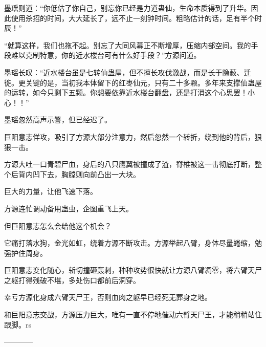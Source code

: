 \begin{this_body}
墨瑶则道：“你低估了你自己，别忘你已经是力道蛊仙，生命本质得到了升华。因此使用杀招的时间，大大延长了，远不止一刻钟时间。粗略估计的话，足有半个时辰！”

“就算这样，我们也拖不起。别忘了大同风幕正不断增厚，压缩内部空间。我的手段难以克制特意，你的近水楼台可有什么好手段？”方源问道。

墨瑶长叹：“近水楼台虽是七转仙蛊屋，但不擅长攻伐激战，而是长于隐蔽、迁徙。更关键的是，当初我本体留下的红枣仙元，只有二十多颗。多年来支撑仙蛊屋的运转，如今只剩下五颗。你想要依靠近水楼台翻盘，还是打消这个心思罢！小心！！”

墨瑶忽然高声示警，但已经迟了。

巨阳意志佯攻，吸引了方源大部分注意力，然后忽然一个转折，绕到他的背后，狠狠一击。

方源大吐一口青碧尸血，身后的八只鹰翼被撞成了渣，脊椎被这一击彻底打断，整个后背内凹下去，胸膛则向前凸出一大块。

巨大的力量，让他飞速下落。

方源连忙调动备用蛊虫，企图重飞上天。

但巨阳意志怎么会给他这个机会？

它痛打落水狗，金光如虹，绕着方源不断攻击。方源举起八臂，身体尽量蜷缩，勉强护住周身。

巨阳意志变化随心，斩切撞砸轰刺，种种攻势很快就让方源八臂凋零，将六臂天尸之躯打得残破不堪，多处伤口都前后洞穿。

幸亏方源化身成六臂天尸王，否则血肉之躯早已经死无葬身之地。

和巨阳意志交战，方源压力巨大，唯有一直不停地催动六臂天尸王，才能稍稍站住跟脚。rs

------------

\end{this_body}

